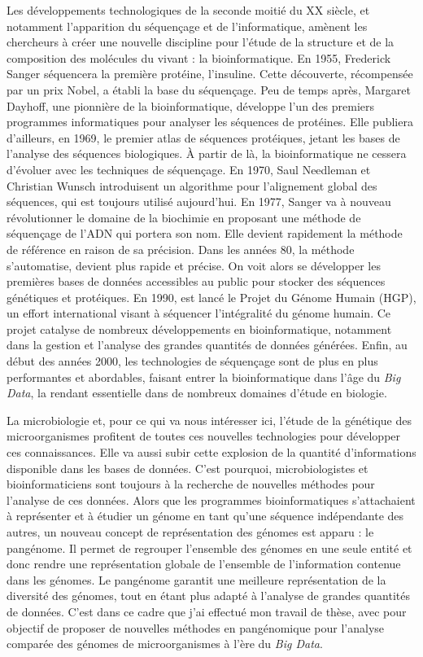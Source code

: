Les développements technologiques de la seconde moitié du XX\ieme{} siècle, et notamment l'apparition du séquençage et de l'informatique, amènent les chercheurs à créer une nouvelle discipline pour l'étude de la structure et de la composition des molécules du vivant : la bioinformatique. En 1955, Frederick Sanger séquencera la première protéine, l'insuline. Cette découverte, récompensée par un prix Nobel, a établi la base du séquençage. Peu de temps après, Margaret Dayhoff, une pionnière de la bioinformatique, développe l'un des premiers programmes informatiques pour analyser les séquences de protéines. Elle publiera d'ailleurs, en 1969, le premier atlas de séquences protéiques, jetant les bases de l'analyse des séquences biologiques. À partir de là, la bioinformatique ne cessera d'évoluer avec les techniques de séquençage. En 1970, Saul Needleman et Christian Wunsch introduisent un algorithme pour l'alignement global des séquences, qui est toujours utilisé aujourd'hui. En 1977, Sanger va à nouveau révolutionner le domaine de la biochimie en proposant une méthode de séquençage de l'ADN qui portera son nom. Elle devient rapidement la méthode de référence en raison de sa précision. Dans les années 80, la méthode s'automatise, devient plus rapide et précise. On voit alors se développer les premières bases de données accessibles au public pour stocker des séquences génétiques et protéiques. En 1990, est lancé le Projet du Génome Humain (HGP), un effort international visant à séquencer l'intégralité du génome humain. Ce projet catalyse de nombreux développements en bioinformatique, notamment dans la gestion et l'analyse des grandes quantités de données générées. Enfin, au début des années 2000, les technologies de séquençage sont de plus en plus performantes et abordables, faisant entrer la bioinformatique dans l'âge du \textit{Big Data}, la rendant essentielle dans de nombreux domaines d'étude en biologie.

La microbiologie et, pour ce qui va nous intéresser ici, l'étude de la génétique des microorganismes profitent de toutes ces nouvelles technologies pour développer ces connaissances. Elle va aussi subir cette explosion de la quantité d'informations disponible dans les bases de données. C'est pourquoi, microbiologistes et bioinformaticiens sont toujours à la recherche de nouvelles méthodes pour l'analyse de ces données. Alors que les programmes bioinformatiques s'attachaient à représenter et à étudier un génome en tant qu'une séquence indépendante des autres, un nouveau concept de représentation des génomes est apparu : le pangénome. Il permet de regrouper l'ensemble des génomes en une seule entité et donc rendre une représentation globale de l'ensemble de l'information contenue dans les génomes. Le pangénome garantit une meilleure représentation de la diversité des génomes, tout en étant plus adapté à l'analyse de grandes quantités de données. C'est dans ce cadre que j'ai effectué mon travail de thèse, avec pour objectif de proposer de nouvelles méthodes en pangénomique pour l'analyse comparée des génomes de microorganismes à l'ère du \textit{Big Data}.

